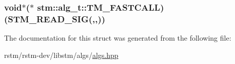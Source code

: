 \hypertarget{structstm_1_1alg__t_ac0cd29ede0e01c3db48a2b189e6ecf76}{
\subsubsection[{T\-M\-\_\-\-F\-A\-S\-T\-C\-A\-L\-L}]{\setlength{\rightskip}{0pt plus 5cm}void$\ast$($\ast$ stm\-::alg\-\_\-t\-::\-T\-M\-\_\-\-F\-A\-S\-T\-C\-A\-L\-L)({\bf S\-T\-M\-\_\-\-R\-E\-A\-D\-\_\-\-S\-I\-G}(,,))}}\label{structstm_1_1alg__t_ac0cd29ede0e01c3db48a2b189e6ecf76}


The documentation for this struct was generated from the following file\-:\begin{DoxyCompactItemize}
\item 
rstm/rstm-\/dev/libstm/algs/\hyperlink{algs_8hpp}{algs.\-hpp}\end{DoxyCompactItemize}
